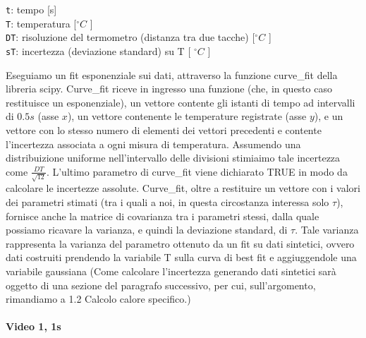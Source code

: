 \documentclass[11pt]{article}
\begin{document}
\texttt{t}: tempo {[}s{]}\\
\texttt{T}: temperatura {[}\(^\circ C\) {]}\\
\texttt{DT}: risoluzione del termometro (distanza tra due tacche)
{[}\(^\circ C\) {]}\\
\texttt{sT}: incertezza (deviazione standard) su T {[} \(^\circ C\) {]}

    Eseguiamo un fit esponenziale sui dati, attraverso la funzione
curve\_fit della libreria scipy. Curve\_fit riceve in ingresso una
funzione (che, in questo caso restituisce un esponenziale), un vettore
contente gli istanti di tempo ad intervalli di \(0.5s\) (asse \(x\)), un
vettore contenente le temperature registrate (asse \(y\)), e un vettore
con lo stesso numero di elementi dei vettori precedenti e contente
l'incertezza associata a ogni misura di temperatura. Assumendo una
distribuizione uniforme nell'intervallo delle divisioni stimiaimo tale
incertezza come \(\frac{DT}{\sqrt{12}}\). L'ultimo parametro di
curve\_fit viene dichiarato TRUE in modo da calcolare le incertezze
assolute. Curve\_fit, oltre a restituire un vettore con i valori dei
parametri stimati (tra i quali a noi, in questa circostanza interessa
solo \(\tau\)), fornisce anche la matrice di covarianza tra i parametri
stessi, dalla quale possiamo ricavare la varianza, e quindi la
deviazione standard, di \(\tau\). Tale varianza rappresenta la varianza
del parametro ottenuto da un fit su dati sintetici, ovvero dati
costruiti prendendo la variabile T sulla curva di best fit e
aggiuggendole una variabile gaussiana (Come calcolare l'incertezza
generando dati sintetici sarà oggetto di una sezione del paragrafo
successivo, per cui, sull'argomento, rimandiamo a 1.2 Calcolo calore
specifico.)

    \hypertarget{video-1-1s}{%
\paragraph{Video 1, 1s}\label{video-1-1s}}
\end{document}
